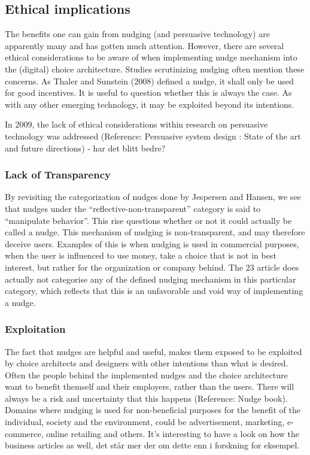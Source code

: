 \subsection{Ethical implications}
The benefits one can gain from nudging (and persuasive technology) are apparently many and has gotten much attention.  However, there are several ethical considerations to be aware of when implementing nudge mechanism into the (digital) choice architecture. Studies scrutinizing nudging often mention these concerns. As Thaler and Sunstein (2008) defined a nudge, it shall only be used for good incentives. It is useful to question whether this is always the case. As with any other emerging technology, it may be exploited beyond its intentions. 

In 2009, the lack of ethical considerations within research on persuasive technology was addressed (Reference: Persuasive system design : State of the art and future directions) - har det blitt bedre? 

\subsubsection{Lack of Transparency}
By revisiting the categorization of nudges done by Jespersen and Hansen, we see that nudges under the “reflective-non-transparent” category is said to “manipulate behavior”. This rise questions whether or not it could actually be called a nudge. This mechanism of nudging is non-transparent, and may therefore deceive users. Examples of this is when nudging is used in commercial purposes, when the user is influenced to use money, take a choice that is not in best interest, but rather for the organization or company behind. The 23 article does actually not categorise any of the defined nudging mechanism in this particular category, which reflects that this is an unfavorable and void way of implementing a nudge. 

\subsubsection{Exploitation}
The fact that nudges are helpful and useful, makes them exposed to be exploited by choice architects and designers with other intentions than what is desired. Often the people behind the implemented nudges and the choice architecture want to benefit themself and their employers, rather than the users. There will always be a risk and uncertainty that this happens (Reference: Nudge book). Domains where nudging is used for non-beneficial purposes for the benefit of the individual, society and the environment, could be advertisement, marketing, e-commerce, online retailing and others. It’s interesting to have a look on how the business articles as well, det står mer der om dette enn i forskning for eksempel. 

